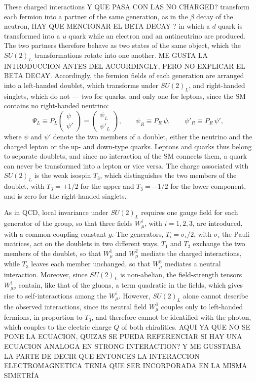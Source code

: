 These charged interactions Y QUE PASA CON LAS NO CHARGED? transform each fermion into a partner of the same generation, as in the $\beta$ decay of the neutron, HAY QUE MENCIONAR EL BETA DECAY ? in which a $d$ quark is transformed into a $u$ quark while an electron and an antineutrino are produced. The two partners therefore behave as two states of the same object, which the $SU(2)_L$ transformations rotate into one another. ME GUSTA LA INTRODUCCION ANTES DEL ACCORDINGLY, PERO NO EXPLICAR EL BETA DECAY. Accordingly, the fermion fields of each generation are arranged into a left-handed doublet, which transforms under $SU(2)_L$, and right-handed singlets, which do not — two for quarks, and only one for leptons, since the SM contains no right-handed neutrino:
\begin{equation}
    \Psi_L \equiv P_L\begin{pmatrix}\psi \\ \psi'\end{pmatrix}=\begin{pmatrix}\psi_L \\ \psi'_L\end{pmatrix}, \qquad
    \psi_R \equiv P_R\,\psi, \qquad
    \psi'_R \equiv P_R\,\psi',
    \label{fermionic_fields}
\end{equation}
%
where $\psi$ and $\psi'$ denote the two members of a doublet, either the neutrino and the charged lepton or the up- and down-type quarks. Leptons and quarks thus belong to separate doublets, and since no interaction of the SM connects them, a quark can never be transformed into a lepton or vice versa. The charge associated with $SU(2)_L$ is the weak isospin $T_3$, which distinguishes the two members of the doublet, with $T_3=+1/2$ for the upper and $T_3=-1/2$ for the lower component, and is zero for the right-handed singlets.

As in QCD, local invariance under $SU(2)_L$ requires one gauge field for each generator of the group, so that three fields $W^i_\mu$, with $i=1,2,3$, are introduced, with a common coupling constant $g$. The generators, $T_i = \sigma_i/2$, with $\sigma_i$ the Pauli matrices, act on the doublets in two different ways. $T_1$ and $T_2$ exchange the two members of the doublet, so that $W^1_\mu$ and $W^2_\mu$ mediate the charged interactions, while $T_3$ leaves each member unchanged, so that $W^3_\mu$ mediates a neutral interaction. Moreover, since $SU(2)_L$ is non-abelian, the field-strength tensors $W^i_{\mu\nu}$ contain, like that of the gluons, a term quadratic in the fields, which gives rise to self-interactions among the $W^i_\mu$. However, $SU(2)_L$ alone cannot describe the observed interactions, since its neutral field $W^3_\mu$ couples only to left-handed fermions, in proportion to $T_3$, and therefore cannot be identified with the photon, which couples to the electric charge $Q$ of both chiralities. AQUI YA QUE NO SE PONE LA ECUACION, QUIZAS SE PUEDA REFERENCIAR SI HAY UNA ECUACION ANALOGA EN STRONG INTERACTION? Y ME GUSSTABA LA PARTE DE DECIR QUE  ENTONCES LA INTERACCION ELECTROMAGNETICA TENIA QUE SER INCORPORADA EN LA MISMA SIMETRÍA\medskip

